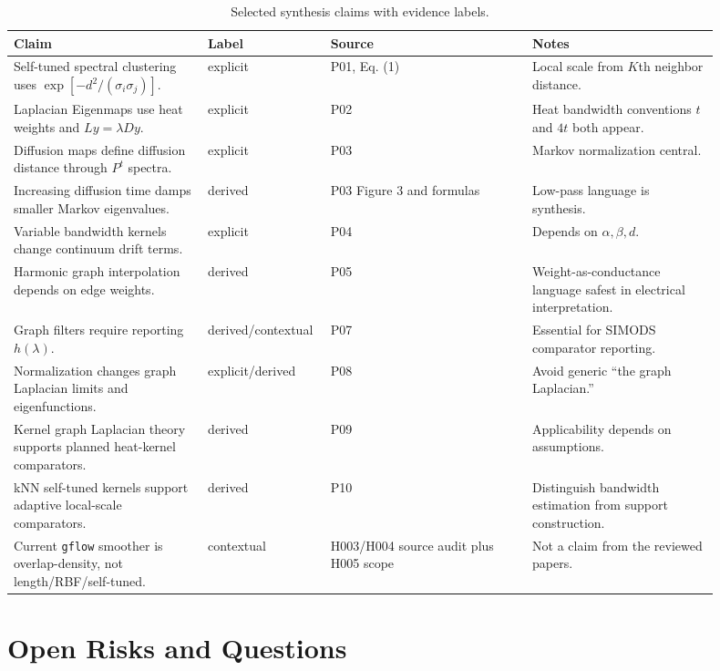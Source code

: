 \documentclass[11pt]{article}
\newcommand{\code}[1]{\texttt{#1}}
\begin{document}
\begin{longtable}{p{0.26\linewidth}p{0.12\linewidth}p{0.27\linewidth}p{0.25\linewidth}}
\caption{Selected synthesis claims with evidence labels.}\\
\toprule
Claim & Label & Source & Notes\\
\midrule
\endhead
Self-tuned spectral clustering uses \(\exp[-d^2/(\sigma_i\sigma_j)]\). &
explicit & P01, Eq. (1) & Local scale from \(K\)th neighbor distance.\\
Laplacian Eigenmaps use heat weights and \(Ly=\lambda Dy\). &
explicit & P02 & Heat bandwidth conventions \(t\) and \(4t\) both appear.\\
Diffusion maps define diffusion distance through \(P^t\) spectra. &
explicit & P03 & Markov normalization central.\\
Increasing diffusion time damps smaller Markov eigenvalues. &
derived & P03 Figure 3 and formulas & Low-pass language is synthesis.\\
Variable bandwidth kernels change continuum drift terms. &
explicit & P04 & Depends on \(\alpha,\beta,d\).\\
Harmonic graph interpolation depends on edge weights. &
derived & P05 & Weight-as-conductance language safest in electrical interpretation.\\
Graph filters require reporting \(h(\lambda)\). &
derived/contextual & P07 & Essential for SIMODS comparator reporting.\\
Normalization changes graph Laplacian limits and eigenfunctions. &
explicit/derived & P08 & Avoid generic ``the graph Laplacian.''\\
Kernel graph Laplacian theory supports planned heat-kernel comparators. &
derived & P09 & Applicability depends on assumptions.\\
kNN self-tuned kernels support adaptive local-scale comparators. &
derived & P10 & Distinguish bandwidth estimation from support construction.\\
Current \code{gflow} smoother is overlap-density, not length/RBF/self-tuned. &
contextual & H003/H004 source audit plus H005 scope & Not a claim from the reviewed papers.\\
\bottomrule
\end{longtable}

\section{Open Risks and Questions}
\end{document}
